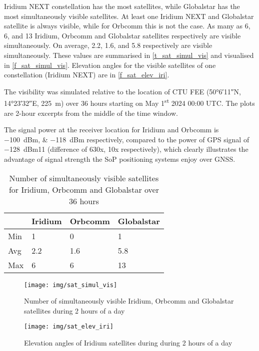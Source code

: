 Iridium NEXT constellation has the most satellites, while Globalstar has the most simultaneously visible satellites. At least one Iridium NEXT and Globalstar satellite is always visible, while for Orbcomm this is not the case. As many as 6, 6, and 13 Iridium, Orbcomm and Globalstar satellites respectively are visible simultaneously. On average, 2.2, 1.6, and 5.8 respectively are visible simultaneously. These values are summarised in \autoref{t_sat_simul_vis} and visualised in \autoref{f_sat_simul_vis}. Elevation angles for the visible satellites of one constellation (Iridium NEXT) are in \autoref{f_sat_elev_iri}.

The visibility was simulated relative to the location of CTU FEE (\ang{50;6;11}N, \ang{14;23;32}E, \qty{225}{m}) over 36 hours starting on May 1\textsuperscript{st} 2024 00:00 UTC. The plots are 2-hour excerpts from the middle of the time window.

The signal power at the receiver location for Iridium and Orbcomm is \qtylist{-100;-118}{dBm} respectively, compared to the power of GPS signal of \qty{-128}{dBm}\citep{pos04}{11} (difference of 630x, 10x respectively), which clearly illustrates the advantage of signal strength the SoP positioning systems enjoy over GNSS.

\begin{table}
    \centering
    \begin{tabular}{llll}
 & Iridium & Orbcomm & Globalstar \\ \hline
Min & 1 & 0 & 1 \\
Avg & 2.2 & 1.6 & 5.8 \\
Max & 6 & 6 & 13 \\
    \end{tabular}
    \caption{Number of simultaneously visible satellites for Iridium, Orbcomm and Globalstar over 36 hours}
    \label{t_sat_simul_vis}
\end{table}

\begin{figure}
    \centering
    \texttt{[image: img/sat\_simul\_vis]}
    \caption{Number of simultaneously visible Iridium, Orbcomm and Globalstar satellites during 2 hours of a day}
    \label{f_sat_simul_vis}
\end{figure}

\begin{figure}
    \centering
    \texttt{[image: img/sat\_elev\_iri]}
    \caption{Elevation angles of Iridium satellites during during 2 hours of a day}
    \label{f_sat_elev_iri}
\end{figure}

